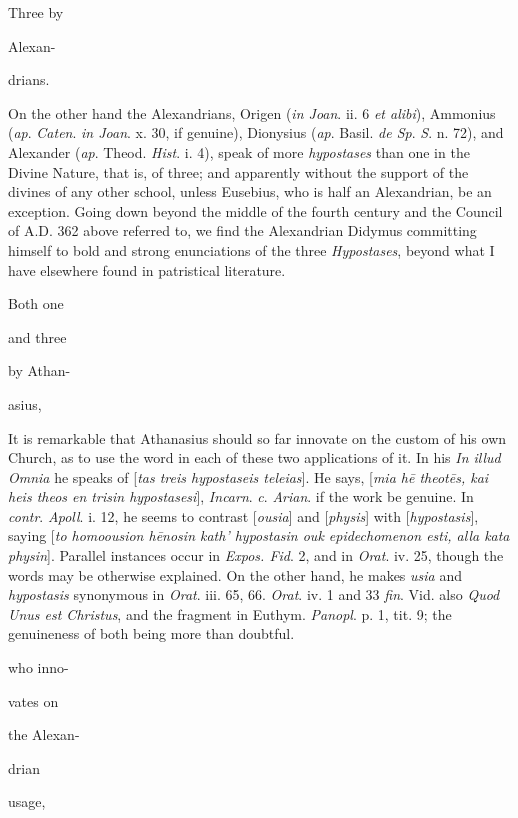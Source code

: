 Three by

Alexan-

drians.

On the other hand the Alexandrians, Origen
(\emph{in Joan}. ii. 6 \emph{et alibi}), Ammonius (\emph{ap}. \emph{Caten}.
\emph{in Joan}. x. 30, if genuine), Dionysius (\emph{ap}.
Basil. \emph{de Sp}. \emph{S}. n. 72), and Alexander (\emph{ap}.
Theod. \emph{Hist}. i. 4), speak of more \emph{hypostases}
than one in the Divine Nature, that is, of three; and
apparently without the support of the divines of any other
school, unless Eusebius, who is half an Alexandrian, be an
exception. Going down beyond the middle of the fourth
century and the Council of A.D. 362 above referred to,
we find the Alexandrian Didymus committing himself to bold and
strong enunciations of the three \emph{Hypostases}, beyond
what I have elsewhere found in patristical literature.

Both one

and three

by Athan-

asius,

It is remarkable that Athanasius should so
far innovate on the custom of his own Church, as to use the
word in each of these two applications of it. In his \emph{In
illud Omnia} he speaks of [\emph{tas treis hypostaseis teleias}].
He says, [\emph{mia h\={e} theot\={e}s, kai heis theos en
trisin hypostasesi}], \emph{Incarn}. \emph{c}. \emph{Arian}.
if the work be genuine. In \emph{contr}. \emph{Apoll}. i. 12,
he seems to contrast [\emph{ousia}] and [\emph{physis}] with [\emph{hypostasis}],
saying [\emph{to homoousion h\={e}nosin kath' hypostasin ouk
epidechomenon esti, alla kata physin}]. Parallel instances
occur in \emph{Expos. Fid}. 2, and in \emph{Orat}. iv. 25,
though the words may be otherwise explained. On the other
hand, he makes \emph{usia} and \emph{hypostasis} synonymous in
\emph{Orat}. iii. 65, 66. \emph{Orat}. iv. 1 and 33 \emph{fin}.
Vid. also \emph{Quod Unus est Christus}, and the fragment in
Euthym. \emph{Panopl}. p. 1, tit. 9; the genuineness of both
being more than doubtful.

who
inno-

vates on

the Alexan-

drian

usage,

